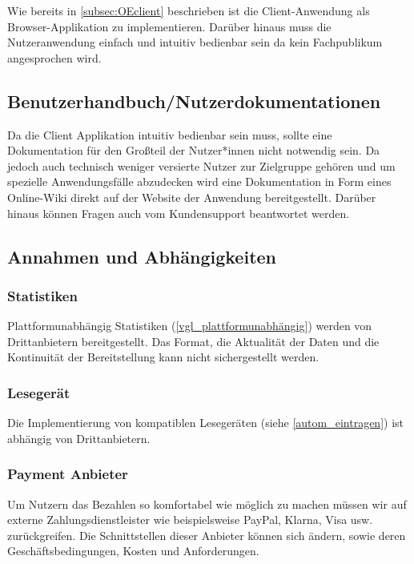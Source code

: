 Wie bereits in \ref{subsec:OEclient} beschrieben ist die Client-Anwendung als Browser-Applikation zu implementieren. Darüber hinaus muss die Nutzeranwendung einfach und intuitiv bedienbar sein da kein Fachpublikum angesprochen wird.

\subsection{Benutzerhandbuch/Nutzerdokumentationen}

Da die Client Applikation intuitiv bedienbar sein muss, sollte eine Dokumentation für den Großteil der Nutzer*innen nicht notwendig sein. Da jedoch auch technisch weniger versierte Nutzer zur Zielgruppe gehören und um spezielle Anwendungsfälle abzudecken wird eine Dokumentation in Form eines Online-Wiki direkt auf der Website der Anwendung bereitgestellt. Darüber hinaus können Fragen auch vom Kundensupport beantwortet werden.

\subsection{Annahmen und Abhängigkeiten}


\subsubsection{Statistiken}
Plattformunabhängig Statistiken (\ref{vgl_plattformunabhängig}) werden von Drittanbietern bereitgestellt. Das Format, die Aktualität der Daten und die Kontinuität der Bereitstellung kann nicht sichergestellt werden. %


\subsubsection{Lesegerät}
Die Implementierung von kompatiblen Lesegeräten (siehe \ref{autom_eintragen}) ist abhängig von Drittanbietern.
\subsubsection{Payment Anbieter}

Um Nutzern das Bezahlen so komfortabel wie möglich zu machen müssen wir auf externe Zahlungsdienstleister wie beispielsweise PayPal, Klarna, Visa usw. zurückgreifen. Die Schnittstellen dieser Anbieter können sich ändern, sowie deren Geschäftsbedingungen, Kosten und Anforderungen. %
